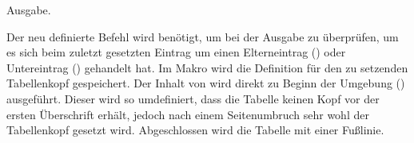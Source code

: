 \documentclass[%
  english,ngerman,%
  cdgeometry=no,DIV=12,%
  automark,%
  listof=toc,%
]{tudscrartcl}
\begin{document}
Ausgabe.
%
\CodeHook{\let\newglossarystyle\renewglossarystyle}
\begin{Hint*}
\end{Hint*}
%
Der neu definierte Befehl  wird benötigt, um bei der 
Ausgabe zu überprüfen, um es sich beim zuletzt gesetzten Eintrag um einen 
Elterneintrag () oder Untereintrag () 
gehandelt hat. Im Makro  wird die Definition für den zu 
setzenden Tabellenkopf gespeichert. Der Inhalt von  wird 
direkt zu Beginn der Umgebung () 
ausgeführt. Dieser wird so umdefiniert, dass die Tabelle keinen Kopf vor der 
ersten Überschrift erhält, jedoch nach einem Seitenumbruch sehr wohl der 
Tabellenkopf gesetzt wird. Abgeschlossen wird die Tabelle mit einer Fußlinie.
\end{document}
